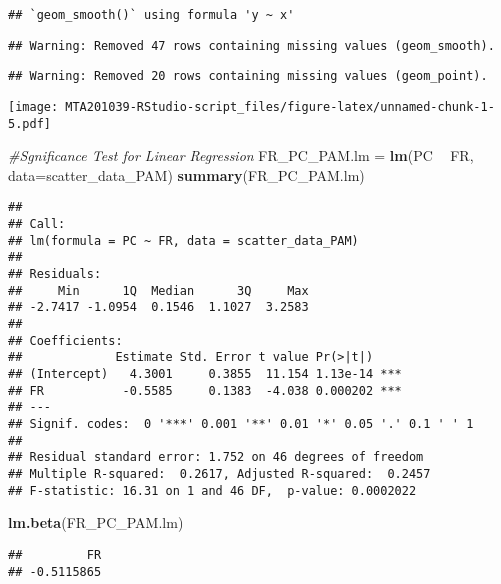 \documentclass[
]{article}
\newenvironment{Shaded}{\begin{snugshade}}{\end{snugshade}}
\newcommand{\CommentTok}[1]{\textcolor[rgb]{0.56,0.35,0.01}{\textit{#1}}}
\newcommand{\DataTypeTok}[1]{\textcolor[rgb]{0.13,0.29,0.53}{#1}}
\newcommand{\KeywordTok}[1]{\textcolor[rgb]{0.13,0.29,0.53}{\textbf{#1}}}
\newcommand{\NormalTok}[1]{#1}
\newcommand{\OperatorTok}[1]{\textcolor[rgb]{0.81,0.36,0.00}{\textbf{#1}}}
\newcommand{\StringTok}[1]{\textcolor[rgb]{0.31,0.60,0.02}{#1}}
\begin{document}
\begin{verbatim}
## `geom_smooth()` using formula 'y ~ x'
\end{verbatim}

\begin{verbatim}
## Warning: Removed 47 rows containing missing values (geom_smooth).
\end{verbatim}

\begin{verbatim}
## Warning: Removed 20 rows containing missing values (geom_point).
\end{verbatim}

\texttt{[image: MTA201039-RStudio-script\_files/figure-latex/unnamed-chunk-1-5.pdf]}

\begin{Shaded}
\begin{Highlighting}[]
\CommentTok{#Sgnificance Test for Linear Regression}
\NormalTok{FR_PC_PAM.lm =}\StringTok{ }\KeywordTok{lm}\NormalTok{(PC }\OperatorTok{~}\StringTok{ }\NormalTok{FR, }\DataTypeTok{data=}\NormalTok{scatter_data_PAM)}
\KeywordTok{summary}\NormalTok{(FR_PC_PAM.lm)}
\end{Highlighting}
\end{Shaded}

\begin{verbatim}
## 
## Call:
## lm(formula = PC ~ FR, data = scatter_data_PAM)
## 
## Residuals:
##     Min      1Q  Median      3Q     Max 
## -2.7417 -1.0954  0.1546  1.1027  3.2583 
## 
## Coefficients:
##             Estimate Std. Error t value Pr(>|t|)    
## (Intercept)   4.3001     0.3855  11.154 1.13e-14 ***
## FR           -0.5585     0.1383  -4.038 0.000202 ***
## ---
## Signif. codes:  0 '***' 0.001 '**' 0.01 '*' 0.05 '.' 0.1 ' ' 1
## 
## Residual standard error: 1.752 on 46 degrees of freedom
## Multiple R-squared:  0.2617, Adjusted R-squared:  0.2457 
## F-statistic: 16.31 on 1 and 46 DF,  p-value: 0.0002022
\end{verbatim}

\begin{Shaded}
\begin{Highlighting}[]
\KeywordTok{lm.beta}\NormalTok{(FR_PC_PAM.lm)}
\end{Highlighting}
\end{Shaded}

\begin{verbatim}
##         FR 
## -0.5115865
\end{verbatim}

\begin{Shaded}
\end{Shaded}
\end{document}
